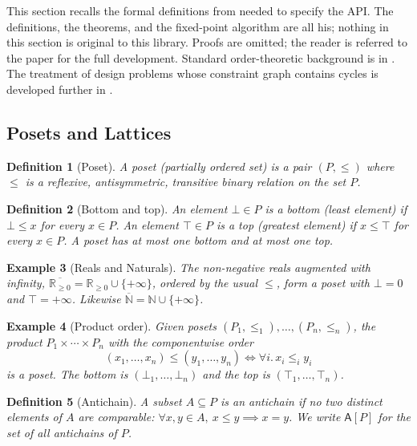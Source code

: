 \documentclass[11pt,a4paper]{article}
\newtheorem{definition}{Definition}[section]
\newtheorem{example}[definition]{Example}
\newcommand{\Rplus}{\mathbb{R}_{\geq 0}}
\newcommand{\Rplustop}{\overline{\Rplus}}
\newcommand{\Nat}{\mathbb{N}}
\newcommand{\Antichain}{\mathsf{A}}
\newcommand{\topp}{\top}
\begin{document}
This section recalls the formal definitions from
\citet{censi2015mathematical} needed to specify the API. The definitions,
the theorems, and the fixed-point algorithm are all his; nothing in this
section is original to this library. Proofs are omitted; the reader is
referred to the paper for the full development. Standard order-theoretic
background is in \citet{davey2002lattices}. The treatment of design
problems whose constraint graph contains cycles is developed further in
\citet{censi2017cyclic}.

\subsection{Posets and Lattices}

\begin{definition}[Poset]
A \emph{poset} (partially ordered set) is a pair $(P, \leq)$ where
$\leq$ is a reflexive, antisymmetric, transitive binary relation on
the set $P$.
\end{definition}

\begin{definition}[Bottom and top]
An element $\bot \in P$ is a \emph{bottom} (least element) if
$\bot \leq x$ for every $x \in P$. An element $\topp \in P$ is a
\emph{top} (greatest element) if $x \leq \topp$ for every $x \in P$.
A poset has at most one bottom and at most one top.
\end{definition}

\begin{example}[Reals and Naturals]
The non-negative reals augmented with infinity, $\Rplustop = \Rplus
\cup \{+\infty\}$, ordered by the usual $\leq$, form a poset with
$\bot = 0$ and $\topp = +\infty$. Likewise $\overline{\Nat} =
\Nat \cup \{+\infty\}$.
\end{example}

\begin{example}[Product order]
Given posets $(P_1, \leq_1), \dots, (P_n, \leq_n)$, the product
$P_1 \times \cdots \times P_n$ with the componentwise order
\[
(x_1, \dots, x_n) \leq (y_1, \dots, y_n)
  \iff \forall i.\, x_i \leq_i y_i
\]
is a poset. The bottom is $(\bot_1, \dots, \bot_n)$ and the top is
$(\topp_1, \dots, \topp_n)$.
\end{example}

\begin{definition}[Antichain]
A subset $A \subseteq P$ is an \emph{antichain} if no two distinct
elements of $A$ are comparable: $\forall x, y \in A,\ x \leq y \implies x = y$.
We write $\Antichain[P]$ for the set of all antichains of $P$.
\end{definition}
\end{document}
